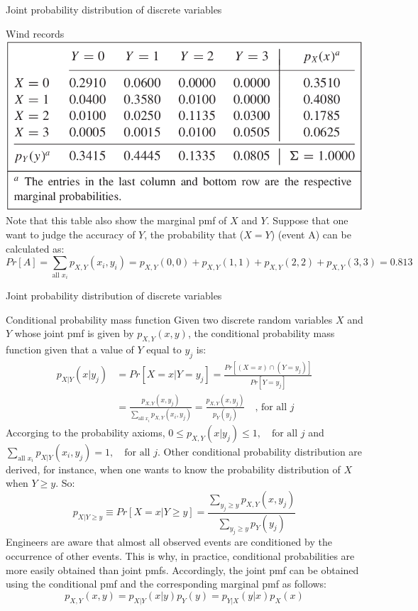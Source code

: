 \documentclass[8pt]{beamer}
\renewcommand{\emph}[1]{\textcolor{myorange}{#1}}
\begin{document}
\begin{frame}{Joint probability distribution of discrete variables}
    \begin{exampleblock}{Wind records}
         \includegraphics[width=\linewidth]{ta331.png}        
         Note that this table also show the \alert{marginal pmf} of $X$ and $Y$. Suppose that one want to judge the accuracy of $Y$, the probability that ($X=Y$) (event A) can be calculated as:
         \[
            \displaystyle
            Pr[A] = \sum_{\text{all } x_i} p_{X,Y} (x_i, y_i) = p_{X,Y} (0,0) + p_{X,Y} (1,1) + p_{X,Y} (2,2) + p_{X,Y} (3,3) = 0.813  
        \]
    \end{exampleblock}
\end{frame}
\begin{frame}{Joint probability distribution of discrete variables}
    \begin{block}{Conditional probability mass function}
        Given two discrete random variables $X$ and $Y$ whose joint \emph{pmf} is given by $p_{X,Y} (x,y)$, the \alert{conditional probability mass function} given that a value of $Y$ equal to $y_j$ is:
        \begin{align*}
            \displaystyle
            p_{X | Y} (x | y_j ) &= Pr[X = x | Y = y_j] = \frac{Pr[(X = x) \cap (Y = y_j)]}{Pr[Y = y_j]} \\ 
                                 &= \frac{p_{X,Y} (x, y_j)}{\sum_{\text{all } x_i} p_{X,Y}(x_i, y_j)} = \frac{p_{X,Y} (x, y_j)}{p_Y (y_j)} \quad \text{, for all $j$}
        \end{align*}
        Accorging to the probability axioms, $0 \leq p_{X,Y} (x | y_j) \leq 1, \quad \text{for all $j$}$ and $\sum_{\text{all } x_i} p_{X|Y} (x_i, y_j) = 1, \quad \text{for all $j$}$.
        Other conditional probability distribution are derived, for instance, when one wants to know the probability distribution of $X$ when $Y \geq y$. So:
         \[
            \displaystyle
            p_{X|Y \geq y} \equiv Pr[X = x| Y \geq y] = \frac{\sum_{y_j \geq y} p_{X,Y}(x, y_j)}{\sum_{y_j \geq y} p_{Y}(y_j)}
        \]
        Engineers are aware that almost all observed events are conditioned by the occurrence of other events. This is why, in practice, conditional probabilities are more easily obtained than joint \emph{pmf}s. Accordingly, the joint \emph{pmf} can be obtained using the conditional \emph{pmf} and the corresponding marginal \emph{pmf} as follows:
         \[
            \displaystyle
            p_{X,Y} (x,y) = p_{X|Y} (x|y)p_Y (y) = p_{Y|X} (y|x) p_X (x)
        \]
    \end{block}
\end{frame}
\end{document}
